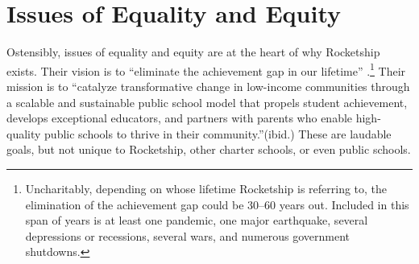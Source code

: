 \section{Issues of Equality and Equity}
\label{sec:issues_equality_equity}\indent%

Ostensibly, issues of equality and equity are at the heart of why Rocketship exists. Their vision is to ``eliminate the achievement gap in our lifetime'' \parencite{RSE2017}.\footnote{Uncharitably, depending on whose lifetime Rocketship is referring to, the elimination of the achievement gap could be 30–60 years out. Included in this span of years is at least one pandemic, one major earthquake, several depressions or recessions, several wars, and numerous government shutdowns.} Their mission is to ``catalyze transformative change in low-income communities through a scalable and sustainable public school model that propels student achievement, develops exceptional educators, and partners with parents who enable high-quality public schools to thrive in their community.''(ibid.) These are laudable goals, but not unique to Rocketship, other charter schools, or even public schools.

